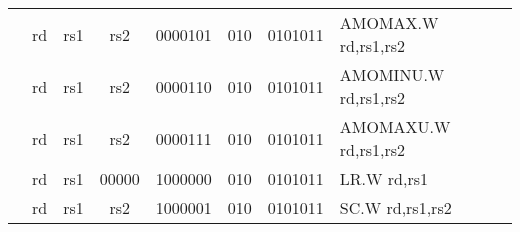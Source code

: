 \begin{table}[p]
\begin{small}
\begin{center}
\begin{tabular}{rccccccccccl}
&
\multicolumn{1}{|c|}{rd} &
\multicolumn{1}{c|}{rs1} &
\multicolumn{1}{c|}{rs2} &
\multicolumn{4}{c|}{0000101} &
\multicolumn{2}{c|}{010} &
\multicolumn{1}{c|}{0101011} & AMOMAX.W rd,rs1,rs2 \\
\cline{2-11}
  

&
\multicolumn{1}{|c|}{rd} &
\multicolumn{1}{c|}{rs1} &
\multicolumn{1}{c|}{rs2} &
\multicolumn{4}{c|}{0000110} &
\multicolumn{2}{c|}{010} &
\multicolumn{1}{c|}{0101011} & AMOMINU.W rd,rs1,rs2 \\
\cline{2-11}
  

&
\multicolumn{1}{|c|}{rd} &
\multicolumn{1}{c|}{rs1} &
\multicolumn{1}{c|}{rs2} &
\multicolumn{4}{c|}{0000111} &
\multicolumn{2}{c|}{010} &
\multicolumn{1}{c|}{0101011} & AMOMAXU.W rd,rs1,rs2 \\
\cline{2-11}
  

&
\multicolumn{1}{|c|}{rd} &
\multicolumn{1}{c|}{rs1} &
\multicolumn{1}{c|}{00000} &
\multicolumn{4}{c|}{1000000} &
\multicolumn{2}{c|}{010} &
\multicolumn{1}{c|}{0101011} & LR.W rd,rs1 \\
\cline{2-11}
  

&
\multicolumn{1}{|c|}{rd} &
\multicolumn{1}{c|}{rs1} &
\multicolumn{1}{c|}{rs2} &
\multicolumn{4}{c|}{1000001} &
\multicolumn{2}{c|}{010} &
\multicolumn{1}{c|}{0101011} & SC.W rd,rs1,rs2 \\
\cline{2-11}
  

\end{tabular}
\end{center}
\end{small}

\label{instr-table}
\end{table}
  

\newpage


